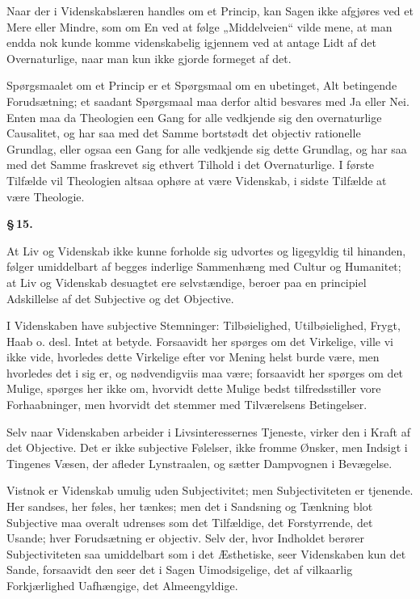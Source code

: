 \documentclass[12pt]{book}
\newcommand{\opage}[1]{\marginnote{\footnotesize\textit{[#1]}}}
\begin{document}
Naar der i Videnskabslæren handles om et Princip, kan Sagen ikke afgjøres ved et Mere
eller Mindre, som om En ved at følge „Middelveien“ vilde mene, at man endda nok kunde
komme videnskabelig igjennem ved at antage Lidt af det Overnaturlige, naar man kun ikke
gjorde formeget af det.

Spørgsmaalet om et Princip er et Spørgsmaal om en ubetinget, Alt betingende
Forudsætning; et saadant Spørgsmaal maa derfor altid besvares med Ja eller Nei. Enten
maa da Theologien een Gang for alle vedkjende sig den overnaturlige Causalitet, og har
saa med det Samme bortstødt det objectiv rationelle Grundlag, eller ogsaa een Gang for
alle vedkjende sig dette Grundlag, og har saa med det Samme fraskrevet sig ethvert
Tilhold i det Overnaturlige. I første Tilfælde vil Theologien altsaa ophøre at være
Videnskab, i sidste Tilfælde at være Theologie.

\begin{center}{\bfseries \S\,15.}\end{center}

At Liv og Videnskab ikke kunne forholde sig udvortes og ligegyldig til hinanden, følger
umiddelbart af begges inderlige Sammenhæng med Cultur og Humanitet; at Liv og Videnskab
desuagtet ere selvstændige, beroer paa en principiel Adskillelse af det Subjective og
det Objective.

I Videnskaben have subjective Stemninger: Tilbøielighed, Utilbøielighed, Frygt, Haab o.
desl. Intet at betyde. Forsaavidt her spørges om det Virkelige, ville vi ikke vide,
hvorledes dette Virkelige efter vor Mening helst burde være, men hvorledes det i sig
er, og nødvendigviis maa være; forsaavidt her spørges om det Mulige, spørges her ikke
om, hvorvidt dette Mulige bedst tilfredsstiller vore Forhaabninger, men hvorvidt det
stemmer med Tilværelsens Betingelser.

Selv naar Videnskaben arbeider i Livsinteressernes Tjeneste, virker den i Kraft af det
Objective. Det er ikke subjective Følelser, ikke fromme Ønsker, men Indsigt i Tingenes
\opage{75} Væsen, der afleder Lynstraalen, og sætter Dampvognen i Bevægelse.

Vistnok er Videnskab umulig uden Subjectivitet; men Subjectiviteten er tjenende. Her
sandses, her føles, her tænkes; men det i Sandsning og Tænkning blot Subjective maa
overalt udrenses som det Tilfældige, det Forstyrrende, det Usande; hver Forudsætning er
objectiv. Selv der, hvor Indholdet berører Subjectiviteten saa umiddelbart som i det
Æsthetiske, seer Videnskaben kun det Sande, forsaavidt den seer det i Sagen
Uimodsigelige, det af vilkaarlig Forkjærlighed Uafhængige, det Almeengyldige.
\end{document}
